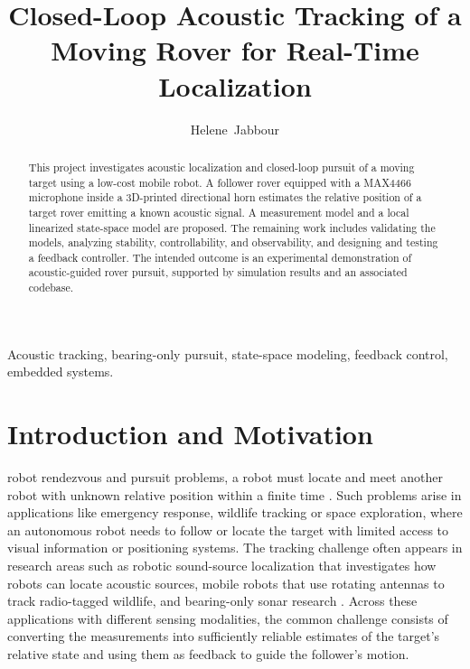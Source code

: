 \documentclass[journal,a4paper]{IEEEtran}
\begin{document}
\title{Closed-Loop Acoustic Tracking of a Moving Rover for Real-Time Localization}

\author{Helene~Jabbour}


\maketitle

\begin{abstract}
This project investigates acoustic localization and closed-loop pursuit of a moving target using a low-cost mobile robot. A follower rover equipped with a MAX4466 microphone inside a 3D-printed directional horn estimates the relative position of a target rover emitting a known acoustic signal. A measurement model and a local linearized state-space model are proposed. The remaining work includes validating the models, analyzing stability, controllability, and observability, and designing and testing a feedback controller. The intended outcome is an experimental demonstration of acoustic-guided rover pursuit, supported by simulation results and an associated codebase.
\end{abstract}

\begin{IEEEkeywords}
Acoustic tracking, bearing-only pursuit, state-space modeling, feedback control, embedded systems.
\end{IEEEkeywords}

\section{Introduction and Motivation}
 robot rendezvous and pursuit problems, a robot must locate and meet another robot with unknown relative position within a finite time \cite{lin2003}. Such problems arise in applications like emergency response, wildlife tracking or space exploration, where an autonomous robot needs to follow or locate the target with limited access to visual information or positioning systems. The tracking challenge often appears in research areas such as robotic sound-source localization that investigates how robots can locate acoustic sources, mobile robots that use rotating antennas to track radio-tagged wildlife, and bearing-only sonar research \cite{rascon2017review,tokekar2011active,nardone1981observability,lingren1978position}. Across these applications with different sensing modalities, the common challenge consists of converting the measurements into sufficiently reliable estimates of the target's relative state and using them as feedback to guide the follower's motion.
\end{document}
